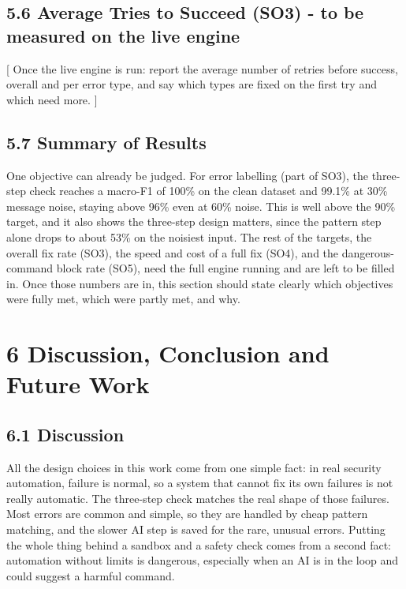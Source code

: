 \documentclass[
]{article}
\begin{document}
\hypertarget{average-tries-to-succeed-so3---to-be-measured-on-the-live-engine}{%
\subsection{5.6 Average Tries to Succeed (SO3) - to be measured on the
live
engine}\label{average-tries-to-succeed-so3---to-be-measured-on-the-live-engine}}

{[} Once the live engine is run: report the average number of retries
before success, overall and per error type, and say which types are
fixed on the first try and which need more. {]}

\hypertarget{summary-of-results}{%
\subsection{5.7 Summary of Results}\label{summary-of-results}}

One objective can already be judged. For error labelling (part of SO3),
the three-step check reaches a macro-F1 of 100\% on the clean dataset
and 99.1\% at 30\% message noise, staying above 96\% even at 60\% noise.
This is well above the 90\% target, and it also shows the three-step
design matters, since the pattern step alone drops to about 53\% on the
noisiest input. The rest of the targets, the overall fix rate (SO3), the
speed and cost of a full fix (SO4), and the dangerous-command block rate
(SO5), need the full engine running and are left to be filled in. Once
those numbers are in, this section should state clearly which objectives
were fully met, which were partly met, and why.

\hypertarget{discussion-conclusion-and-future-work}{%
\section{6 Discussion, Conclusion and Future
Work}\label{discussion-conclusion-and-future-work}}

\hypertarget{discussion}{%
\subsection{6.1 Discussion}\label{discussion}}

All the design choices in this work come from one simple fact: in real
security automation, failure is normal, so a system that cannot fix its
own failures is not really automatic. The three-step check matches the
real shape of those failures. Most errors are common and simple, so they
are handled by cheap pattern matching, and the slower AI step is saved
for the rare, unusual errors. Putting the whole thing behind a sandbox
and a safety check comes from a second fact: automation without limits
is dangerous, especially when an AI is in the loop and could suggest a
harmful command.
\end{document}
